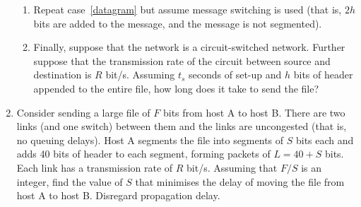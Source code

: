 \documentclass[12pt,a4paper]{article}
\begin{document}
\begin{enumerate}
\begin{enumerate}
      \item Repeat case~\ref{datagram} but assume message switching is
        used (that is, \(2h\) bits are added to the message, and the
        message is not segmented).

      \item Finally, suppose that the network is a circuit-switched
        network. Further suppose that the transmission rate of the
        circuit between source and destination is \(R\)
        bit/s. Assuming \(t_s\) seconds of set-up and \(h\) bits of
        header appended to the entire file, how long does it take to
        send the file?

    \end{enumerate}

  \item Consider sending a large file of \(F\) bits from host A to
    host B. There are two links (and one switch) between them and the
    links are uncongested (that is, no queuing delays). Host A
    segments the file into segments of \(S\) bits each and adds 40
    bits of header to each segment, forming packets of \(L = 40 + S\)
    bits. Each link has a transmission rate of \(R\) bit/s. Assuming
    that \(F/S\) is an integer, find the value of \(S\) that minimises
    the delay of moving the file from host A to host B. Disregard
    propagation delay.

\end{enumerate}
\end{document}
